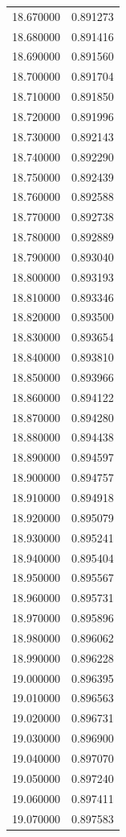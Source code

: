 \begin{tabular}{rr}
18.670000 & 0.891273 \\
18.680000 & 0.891416 \\
18.690000 & 0.891560 \\
18.700000 & 0.891704 \\
18.710000 & 0.891850 \\
18.720000 & 0.891996 \\
18.730000 & 0.892143 \\
18.740000 & 0.892290 \\
18.750000 & 0.892439 \\
18.760000 & 0.892588 \\
18.770000 & 0.892738 \\
18.780000 & 0.892889 \\
18.790000 & 0.893040 \\
18.800000 & 0.893193 \\
18.810000 & 0.893346 \\
18.820000 & 0.893500 \\
18.830000 & 0.893654 \\
18.840000 & 0.893810 \\
18.850000 & 0.893966 \\
18.860000 & 0.894122 \\
18.870000 & 0.894280 \\
18.880000 & 0.894438 \\
18.890000 & 0.894597 \\
18.900000 & 0.894757 \\
18.910000 & 0.894918 \\
18.920000 & 0.895079 \\
18.930000 & 0.895241 \\
18.940000 & 0.895404 \\
18.950000 & 0.895567 \\
18.960000 & 0.895731 \\
18.970000 & 0.895896 \\
18.980000 & 0.896062 \\
18.990000 & 0.896228 \\
19.000000 & 0.896395 \\
19.010000 & 0.896563 \\
19.020000 & 0.896731 \\
19.030000 & 0.896900 \\
19.040000 & 0.897070 \\
19.050000 & 0.897240 \\
19.060000 & 0.897411 \\
19.070000 & 0.897583 \\

\end{tabular}
